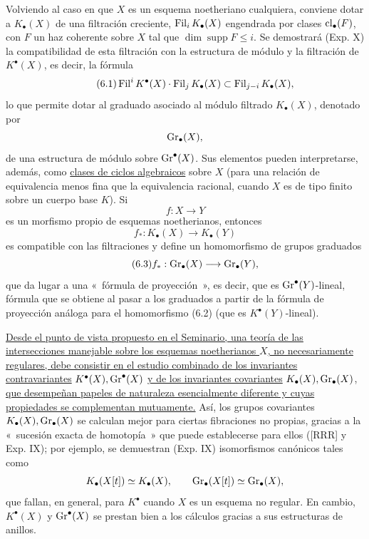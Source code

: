 Volviendo al caso en que $X$ es un esquema noetheriano cualquiera, conviene
dotar a $K_\bullet(X)$ de una filtración creciente,
$\operatorname{Fil}_iK_\bullet(X)$ engendrada por clases $\operatorname{cl}_\bullet(F)$, con $F$ un haz
coherente sobre $X$ tal que $\dim \operatorname{supp}F\le i$. Se demostrará
(Exp. X) la compatibilidad de esta filtración con la estructura de módulo y
la filtración de $K^\bullet(X)$, es decir, la fórmula
\begin{equation}\tag{6.1}
\operatorname{Fil}^iK^\bullet(X)\cdot \operatorname{Fil}_jK_\bullet(X)\subset \operatorname{Fil}_{j-i}K_\bullet(X),
\end{equation}
lo que permite dotar al graduado asociado al módulo filtrado $K_\bullet(X)$,
denotado por
\[
\operatorname{Gr}_\bullet(X),
\]
de una estructura de módulo sobre $\operatorname{Gr}^\bullet(X)$. Sus elementos pueden
interpretarse, además, como \uline{clases de ciclos algebraicos} sobre $X$
(para una relación de equivalencia menos fina que la equivalencia racional,
cuando $X$ es de tipo finito sobre un cuerpo base $K$). Si
\[
f:X\longrightarrow Y
\]
es un morfismo propio de esquemas noetherianos, entonces
\begin{equation}\tag{6.2}
f_*:K_\bullet(X)\longrightarrow K_\bullet(Y)
\end{equation}
es compatible con las filtraciones y define un homomorfismo de grupos
graduados
\begin{equation}\tag{6.3}
f_*:\operatorname{Gr}_\bullet(X)\longrightarrow \operatorname{Gr}_\bullet(Y),
\end{equation}
que da lugar a una «~fórmula de proyección~», es decir, que es
$\operatorname{Gr}^\bullet(Y)$-lineal, fórmula que se obtiene al pasar a los graduados a
partir de la fórmula de proyección análoga para el homomorfismo (6.2) (que es
$K^\bullet(Y)$-lineal).

\uline{Desde el punto de vista propuesto en el Seminario, una teoría de las
intersecciones manejable sobre los esquemas noetherianos $X$, no
necesariamente regulares, debe consistir en el estudio combinado de los
invariantes contravariantes} $K^\bullet(X),\operatorname{Gr}^\bullet(X)$ \uline{y de los
invariantes covariantes} $K_\bullet(X),\operatorname{Gr}_\bullet(X)$, \uline{que desempeñan
papeles de naturaleza esencialmente diferente y cuyas propiedades se
complementan mutuamente.} Así, los grupos covariantes
$K_\bullet(X),\operatorname{Gr}_\bullet(X)$ se calculan mejor para ciertas fibraciones no
propias, gracias a la «~sucesión exacta de homotopía~» que puede establecerse
para ellos ([RRR] y Exp. IX); por ejemplo, se demuestran (Exp. IX)
isomorfismos canónicos tales como
\[
K_\bullet(X[t])\simeq K_\bullet(X),\qquad \operatorname{Gr}_\bullet(X[t])\simeq \operatorname{Gr}_\bullet(X),
\]
que fallan, en general, para $K^\bullet$ cuando $X$ es un esquema no regular.
En cambio, $K^\bullet(X)$ y $\operatorname{Gr}^\bullet(X)$ se prestan bien a los cálculos
gracias a sus estructuras de anillos.

